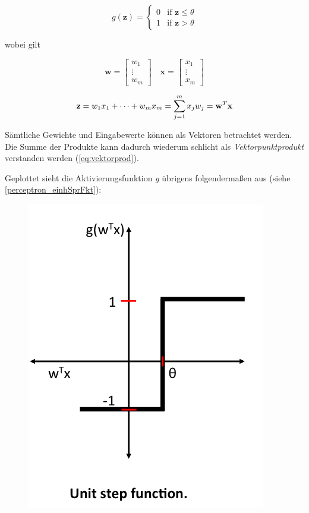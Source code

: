 \begin{equation} \label{eq:aktFkt}
g(\mathbf{z}) =\begin{cases}
	0 & \mbox{if } \mathbf{z} \leq \theta \\
    1 & \mbox{if } \mathbf{z} > \theta
  \end{cases}
\end{equation}

wobei gilt 

\begin{equation} \label{eq:vektorprod}
\mathbf{w} = \begin{bmatrix}
    w_{1}  \\
    \vdots \\
    w_{m}
\end{bmatrix}
\quad  \mathbf{x} = \begin{bmatrix}
    x_{1}  \\
    \vdots \\
    x_{m}
\end{bmatrix}
\end{equation}

\begin{equation}
\mathbf{z} =  w_1x_{1} + \dots + w_mx_{m} = \sum_{j=1}^{m} x_{j}w_{j} \\ = \mathbf{w}^T\mathbf{x}
\end{equation}

Sämtliche Gewichte und Eingabewerte können als Vektoren betrachtet werden. Die Summe der Produkte kann dadurch wiederum schlicht als \emph{Vektorpunktprodukt} verstanden werden (\ref{eq:vektorprod}).

Geplottet sieht die Aktivierungsfunktion \emph{g} übrigens folgendermaßen aus (siehe \ref{perceptron_einhSprFkt}): 

\begin{figure}[!htb]
	\centering
	\includegraphics[width=.5\linewidth]{./img/perceptron_einheitsSprungfunktion}
	\label{fig:perceptron_einhSprFkt}
\end{figure}

